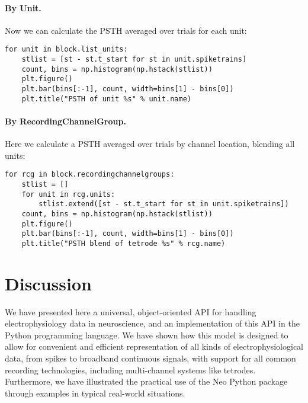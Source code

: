 \documentclass{frontiers}
\begin{document}
\paragraph{By Unit.}
Now we can calculate the PSTH averaged over trials for each unit:

\begin{lstlisting}[style=display]
for unit in block.list_units:
    stlist = [st - st.t_start for st in unit.spiketrains]
    count, bins = np.histogram(np.hstack(stlist))
    plt.figure()
    plt.bar(bins[:-1], count, width=bins[1] - bins[0])
    plt.title("PSTH of unit %s" % unit.name)
\end{lstlisting}


\paragraph{By RecordingChannelGroup.}
Here we calculate a PSTH averaged over trials by channel location, blending all units:
\begin{lstlisting}[style=display]
for rcg in block.recordingchannelgroups:
    stlist = []
    for unit in rcg.units:
        stlist.extend([st - st.t_start for st in unit.spiketrains])
    count, bins = np.histogram(np.hstack(stlist))
    plt.figure()
    plt.bar(bins[:-1], count, width=bins[1] - bins[0])
    plt.title("PSTH blend of tetrode %s" % rcg.name)
\end{lstlisting}



\section{Discussion}


We have presented here a universal, object-oriented API for handling electrophysiology data in neuroscience, and an implementation of this API in the Python programming language. 
We have shown how this model is designed to allow for convenient and efficient representation of all kinds of electrophysiological data, from spikes to broadband continuous signals, with support for all common recording technologies, including multi-channel systems like tetrodes.
Furthermore, we have illustrated the practical use of the Neo Python package through examples in typical real-world situations.
\end{document}

